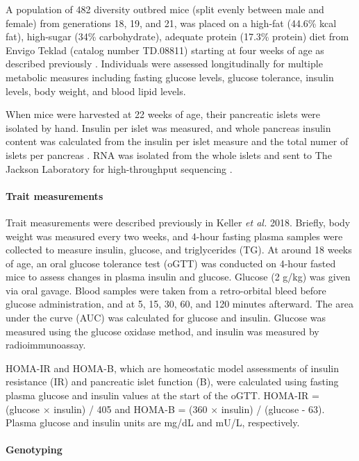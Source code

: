 \documentclass[
]{article}
\begin{document}
A population of 482 diversity outbred mice (split evenly between male
and female) from generations 18, 19, and 21, was placed on a high-fat
(44.6\% kcal fat), high-sugar (34\% carbohydrate), adequate protein
(17.3\% protein) diet from Envigo Teklad (catalog number TD.08811)
starting at four weeks of age as described previously
\cite{pmid29567659}. Individuals were assessed longitudinally for
multiple metabolic measures including fasting glucose levels, glucose
tolerance, insulin levels, body weight, and blood lipid levels.

When mice were harvested at 22 weeks of age, their pancreatic islets
were isolated by hand. Insulin per islet was measured, and whole
pancreas insulin content was calculated from the insulin per islet
measure and the total numer of islets per pancreas \cite{pmid29567659}.
RNA was isolated from the whole islets and sent to The Jackson
Laboratory for high-throughput sequencing \cite{pmid29567659}.

\paragraph{Trait measurements}\label{trait-measurements}

Trait measurements were described previously in Keller \textit{et al.}
2018\cite{pmid29567659}. Briefly, body weight was measured every two
weeks, and 4-hour fasting plasma samples were collected to measure
insulin, glucose, and triglycerides (TG). At around 18 weeks of age, an
oral glucose tolerance test (oGTT) was conducted on 4-hour fasted mice
to assess changes in plasma insulin and glucose. Glucose (2 g/kg) was
given via oral gavage. Blood samples were taken from a retro-orbital
bleed before glucose administration, and at 5, 15, 30, 60, and 120
minutes afterward. The area under the curve (AUC) was calculated for
glucose and insulin. Glucose was measured using the glucose oxidase
method, and insulin was measured by radioimmunoassay.

HOMA-IR and HOMA-B, which are homeostatic model assessments of insulin
resistance (IR) and pancreatic islet function (B), were calculated using
fasting plasma glucose and insulin values at the start of the oGTT.
HOMA-IR = (glucose \(\times\) insulin) / 405 and HOMA-B = (360
\(\times\) insulin) / (glucose - 63). Plasma glucose and insulin units
are mg/dL and mU/L, respectively.

\paragraph{Genotyping}\label{genotyping}
\end{document}
